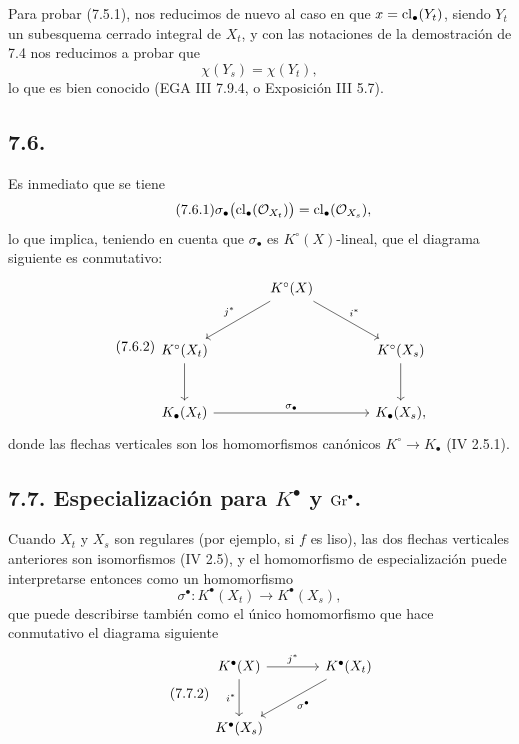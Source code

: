 Para probar (7.5.1), nos reducimos de nuevo al caso en que \(x=\operatorname{cl}_\bullet(Y_t)\), siendo \(Y_t\) un subesquema cerrado integral de \(X_t\), y con las notaciones de la demostración de 7.4 nos reducimos a probar que
\[
  \chi(Y_s)=\chi(Y_t),
\]
lo que es bien conocido (EGA III 7.9.4, o Exposición III 5.7).

\subsection*{7.6.}
Es inmediato que se tiene
\begin{equation}\tag{7.6.1}
  \sigma_\bullet\bigl(\operatorname{cl}_\bullet(\mathcal O_{X_t})\bigr)=\operatorname{cl}_\bullet(\mathcal O_{X_s}),
\end{equation}
lo que implica, teniendo en cuenta que \(\sigma_\bullet\) es \(K^\circ(X)\)-lineal, que el diagrama siguiente es conmutativo:
\begin{equation}\tag{7.6.2}
\begin{tikzcd}[column sep=large,row sep=large]
& K^\circ(X) \arrow[dl,"j^*"'] \arrow[dr,"i^*"] &\\
K^\circ(X_t) \arrow[d] && K^\circ(X_s) \arrow[d]\\
K_\bullet(X_t) \arrow[rr,"\sigma_\bullet"] && K_\bullet(X_s),
\end{tikzcd}
\end{equation}
donde las flechas verticales son los homomorfismos canónicos \(K^\circ\to K_\bullet\) (IV 2.5.1).

\subsection*{7.7. Especialización para \(K^\bullet\) y \(\operatorname{Gr}^\bullet\).}
Cuando \(X_t\) y \(X_s\) son regulares (por ejemplo, si \(f\) es liso), las dos flechas verticales anteriores son isomorfismos (IV 2.5), y el homomorfismo de especialización puede interpretarse entonces como un homomorfismo
\begin{equation}\tag{7.7.1}
  \sigma^\bullet:K^\bullet(X_t)\longrightarrow K^\bullet(X_s),
\end{equation}
que puede describirse también como el único homomorfismo que hace conmutativo el diagrama siguiente
\begin{equation}\tag{7.7.2}
\begin{tikzcd}[column sep=large,row sep=large]
K^\bullet(X) \arrow[r,"j^*"] \arrow[d,"i^*"'] & K^\bullet(X_t) \arrow[dl,"\sigma^\bullet"]\\
K^\bullet(X_s) &
\end{tikzcd}
\end{equation}

